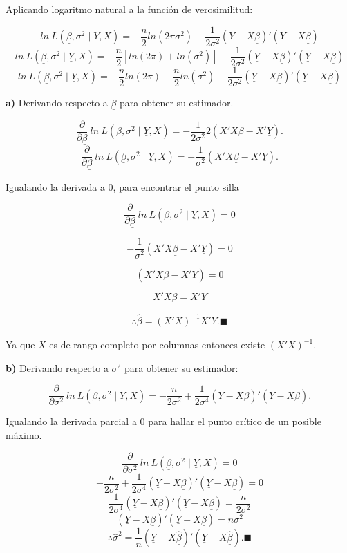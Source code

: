 \documentclass[
  a4paper,
  oneside,
  openany]{book}
\begin{document}
Aplicando logaritmo natural a la función de verosimilitud:

\[
ln \ L(\underline{\beta},\sigma^2 \mid \underline{Y},X)= -\frac{n}{2}ln(2\pi\sigma^2)-\frac{1}{2\sigma^2}(\underline{Y}-X\underline{\beta})'(\underline{Y}-X\underline{\beta})
\]
\[ln \ L(\underline{\beta},\sigma^2 \mid \underline{Y},X)= -\frac{n}{2}[ln(2\pi)+ln(\sigma^2)]-\frac{1}{2\sigma^2}(\underline{Y}-X\underline{\beta})'(\underline{Y}-X\underline{\beta})\]
\[ln \ L(\underline{\beta},\sigma^2 \mid \underline{Y},X)= -\frac{n}{2}ln(2\pi)-\frac{n}{2}ln(\sigma^2)-\frac{1}{2\sigma^2}(\underline{Y}-X\underline{\beta})'(\underline{Y}-X\underline{\beta})\]

\textbf{a)} Derivando respecto a \(\underline{\beta}\) para obtener su estimador.

\[\frac{\partial}{\partial \underline{\beta}} \ ln \ L(\underline{\beta},\sigma^2 \mid \underline{Y},X)=-\frac{1}{2\sigma^2}2(X'X\underline{\beta}-X'\underline{Y}).\]
\[\frac{\partial}{\partial \underline{\beta}} \ ln \ L(\underline{\beta},\sigma^2 \mid \underline{Y},X)=-\frac{1}{\sigma^2}(X'X\underline{\beta}-X'\underline{Y}).\]

Igualando la derivada a 0, para encontrar el punto silla

\[\frac{\partial}{\partial \underline{\beta}} \ ln \ L(\underline{\beta},\sigma^2 \mid \underline{Y},X)=0\]

\[-\frac{1}{\sigma^2}(X'X\underline{\beta}-X'\underline{Y})=0\]

\[(X'X\underline{\beta}-X'\underline{Y})=0\]

\[X'X\underline{\beta}=X'\underline{Y}\]

\[\therefore \underline{\hat{\beta}}=(X'X)^{-1}X'\underline{Y}. \blacksquare\]

Ya que \(X\) es de rango completo por columnas entonces existe \((X'X)^{-1}.\)

\textbf{b)} Derivando respecto a \(\sigma^2\) para obtener su estimador:

\[\frac{\partial}{\partial\sigma^2} \ ln \ L(\underline{\beta},\sigma^2 \mid \underline{Y},X)=-\frac{n}{2\sigma^2}+\frac{1}{2\sigma^4}(\underline{Y}-X\underline{\beta})'(\underline{Y}-X\underline{\beta}).\]

Igualando la derivada parcial a 0 para hallar el punto crítico de un posible máximo.

\[\frac{\partial}{\partial\sigma^2} \ ln \ L(\underline{\beta}, \sigma^2 \mid \underline{Y},X)=0\]
\[-\frac{n}{2\sigma^2}+\frac{1}{2\sigma^4}(\underline{Y}-X\underline{\beta})'(\underline{Y}-X\underline{\beta})=0\]
\[\frac{1}{2\sigma^4}(\underline{Y}-X\underline{\beta})'(\underline{Y}-X\underline{\beta})=\frac{n}{2\sigma^2}\]
\[(\underline{Y}-X\underline{\beta})'(\underline{Y}-X\underline{\beta})=n\sigma^2\]
\[\therefore \hat{\sigma}^2=\frac{1}{n}\left( \underline{Y}-X\underline{\hat{\beta}}\right)'\left(\underline{Y}-X \underline{\hat{\beta}}\right).\blacksquare\]
\end{document}
